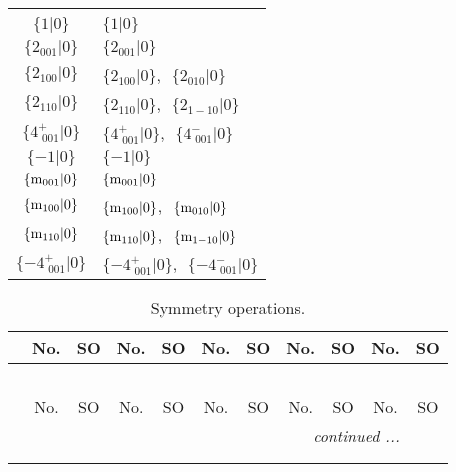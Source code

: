 \documentclass[fleqn,10pt,landscape]{article}
\begin{document}
\begin{itemize}
\begin{center}
\begin{longtable}{c|l}
 \hline \hline
\multicolumn{1}{r}{} \\ \endlastfoot

$\{1|0\}$ & $\{1|0\}$ \\ \hline
$\{2{}_{001}|0\}$ & $\{2{}_{001}|0\}$ \\ \hline
$\{2{}_{100}|0\}$ & $\{2{}_{100}|0\}$,\,\, $\{2{}_{010}|0\}$ \\ \hline
$\{2{}_{110}|0\}$ & $\{2{}_{110}|0\}$,\,\, $\{2{}_{1-10}|0\}$ \\ \hline
$\{4^{+}_{\,\,001}|0\}$ & $\{4^{+}_{\,\,001}|0\}$,\,\, $\{4^{-}_{\,\,001}|0\}$ \\ \hline
$\{-1|0\}$ & $\{-1|0\}$ \\ \hline
$\{{\rm m}_{001}|0\}$ & $\{{\rm m}_{001}|0\}$ \\ \hline
$\{{\rm m}_{100}|0\}$ & $\{{\rm m}_{100}|0\}$,\,\, $\{{\rm m}_{010}|0\}$ \\ \hline
$\{{\rm m}_{110}|0\}$ & $\{{\rm m}_{110}|0\}$,\,\, $\{{\rm m}_{1-10}|0\}$ \\ \hline
$\{-4^{+}_{\,\,001}|0\}$ & $\{-4^{+}_{\,\,001}|0\}$,\,\, $\{-4^{-}_{\,\,001}|0\}$ \\
\end{longtable}
\end{center}
\begin{center}
\renewcommand{\arraystretch}{1.3}
\begin{longtable}{c|cc|cc|cc|cc|cc}
\caption{Symmetry operations.}
 \\
 \hline \hline
 & No. & SO & No. & SO & No. & SO & No. & SO & No. & SO \\ \hline \endfirsthead

\multicolumn{10}{l}{\tablename\ \thetable{}} \\
 \hline \hline
 & No. & SO & No. & SO & No. & SO & No. & SO & No. & SO \\ \hline \endhead

 \hline \hline
\multicolumn{10}{r}{\footnotesize\it continued ...} \\ \endfoot

 \hline \hline
\multicolumn{10}{r}{} \\ \endlastfoot


\end{longtable}
\end{center}
\end{itemize}
\end{document}

